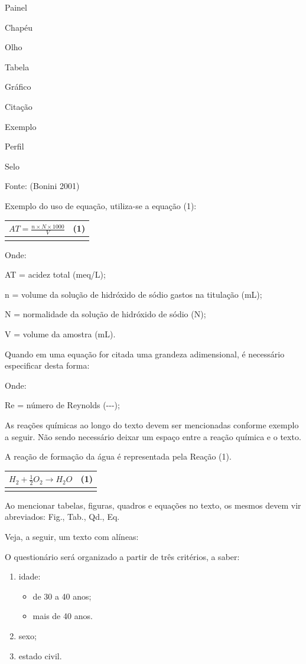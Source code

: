 \documentclass[
]{article}
\begin{document}
Painel

Chapéu

Olho

Tabela

Gráfico

Citação

Exemplo

Perfil

Selo

Fonte: (Bonini 2001)

Exemplo do uso de equação, utiliza-se a equação (1):

\begin{longtable}[]{@{}ll@{}}
\toprule\noalign{}
\(AT = \frac{n \times N \times 1000}{V}\) & (1) \\
\midrule\noalign{}
\endhead
\bottomrule\noalign{}
\endlastfoot
\end{longtable}

Onde:

AT = acidez total (meq/L);

n = volume da solução de hidróxido de sódio gastos na titulação (mL);

N = normalidade da solução de hidróxido de sódio (N);

V = volume da amostra (mL).

Quando em uma equação for citada uma grandeza adimensional, é necessário
especificar desta forma:

Onde:

Re = número de Reynolds (-\/-\/-);

As reações químicas ao longo do texto devem ser mencionadas conforme
exemplo a seguir. Não sendo necessário deixar um espaço entre a reação
química e o texto.

A reação de formação da água é representada pela Reação (1).

\begin{longtable}[]{@{}ll@{}}
\toprule\noalign{}
\(H_{2} + \frac{1}{2}O_{2} \rightarrow H_{2}O\) & (1) \\
\midrule\noalign{}
\endhead
\bottomrule\noalign{}
\endlastfoot
\end{longtable}

Ao mencionar tabelas, figuras, quadros e equações no texto, os mesmos
devem vir abreviados: Fig., Tab., Qd., Eq.

Veja, a seguir, um texto com alíneas:

O questionário será organizado a partir de três critérios, a saber:

\begin{enumerate}
\def\labelenumi{\alph{enumi})}
\item
  idade:

  \begin{itemize}
  \item
    de 30 a 40 anos;
  \item
    mais de 40 anos.
  \end{itemize}
\item
  sexo;
\item
  estado civil.
\end{enumerate}
\end{document}
